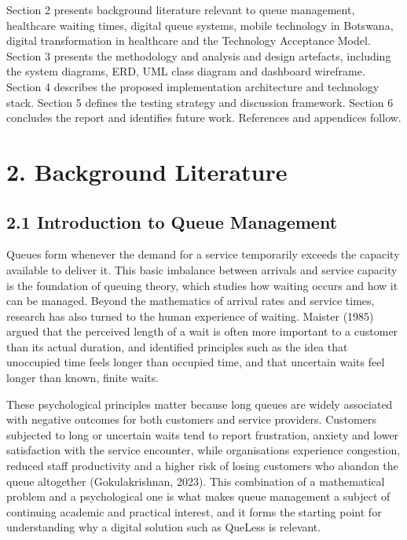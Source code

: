 \documentclass[
]{article}
\begin{document}
Section 2 presents background literature relevant to queue management,
healthcare waiting times, digital queue systems, mobile technology in
Botswana, digital transformation in healthcare and the Technology
Acceptance Model. Section 3 presents the methodology and analysis and
design artefacts, including the system diagrams, ERD, UML class diagram
and dashboard wireframe. Section 4 describes the proposed implementation
architecture and technology stack. Section 5 defines the testing
strategy and discussion framework. Section 6 concludes the report and
identifies future work. References and appendices follow.

\section{2. Background Literature}\label{background-literature}

\subsection{2.1 Introduction to Queue
Management}\label{introduction-to-queue-management}

Queues form whenever the demand for a service temporarily exceeds the
capacity available to deliver it. This basic imbalance between arrivals
and service capacity is the foundation of queuing theory, which studies
how waiting occurs and how it can be managed. Beyond the mathematics of
arrival rates and service times, research has also turned to the human
experience of waiting. Maister (1985) argued that the perceived length
of a wait is often more important to a customer than its actual
duration, and identified principles such as the idea that unoccupied
time feels longer than occupied time, and that uncertain waits feel
longer than known, finite waits.

These psychological principles matter because long queues are widely
associated with negative outcomes for both customers and service
providers. Customers subjected to long or uncertain waits tend to report
frustration, anxiety and lower satisfaction with the service encounter,
while organisations experience congestion, reduced staff productivity
and a higher risk of losing customers who abandon the queue altogether
(Gokulakrishnan, 2023). This combination of a mathematical problem and a
psychological one is what makes queue management a subject of continuing
academic and practical interest, and it forms the starting point for
understanding why a digital solution such as QueLess is relevant.
\end{document}
